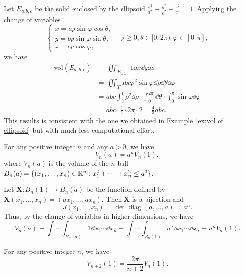 \begin{exampleenv}
    Let $E_{a,b,c}$ be the solid enclosed by the ellipsoid $\displaystyle \frac{x^2}{a^2} + \frac{y^2}{b^2} + \frac{z^2}{c^2} = 1$. Applying the change of variables
    \[
    \begin{cases}
    x = a \rho \sin \varphi \cos \theta,\\
    y = b \rho \sin \varphi \sin \theta,\\
    z = c \rho \cos \varphi,
    \end{cases}
    \quad \rho \geq 0, \theta \in [0, 2\pi), \varphi \in [0,\pi],
    \]
    we have
    \[
    \begin{aligned}
        \text{vol}(E_{a,b,c}) &= \iiint_{E_{a,b,c}} 1 \dd x \dd y \dd z\\
        &= \iiint_T a b c \rho^2 \sin\varphi \dd \rho \dd \theta \dd \varphi\\
        &= abc \int_0^1 \rho^2 \dd \rho \cdot \int_0^{2\pi} \dd \theta \cdot \int_0^\pi \sin\varphi \dd \varphi\\
        &= abc\cdot\frac{1}{3} \cdot 2\pi \cdot 2 = \frac{4}{3} abc.
    \end{aligned}
    \]
    This results is consistent with the one we obtained in Example~\ref{ex:vol of ellipsoid} but with much less computational effort.
\end{exampleenv}
\begin{lemmaenv}\label{lem:scaling for vol of n-ball}
    For any positive integer $n$ and any $a > 0$, we have
    $$
    V_n(a) = a^n V_n(1),
    $$
    where $V_n(a)$ is the volume of the $n$-ball $B_n(a) = \{(x_1, \ldots, x_n) \in \mathbb{R}^n : x_1^2 + \cdots + x_n^2 \leq a^2\}$.
\end{lemmaenv}
\begin{proofenv}
    Let $\bm X: B_n(1) \to B_n(a)$ be the function defined by $\bm X(x_1, \ldots, x_n) = (a x_1, \ldots, a x_n)$. Then $\bm X$ is a bijection and
    \[
    J(x_1, \ldots, x_n) = \det \operatorname{diag}(a, \ldots, a) = a^n.
    \]
    Thus, by the change of variables in higher dimensions, we have
    \[
    V_n(a) = \int \cdots \int_{B_n(a)} 1 \dd x_1 \cdots \dd x_n = \int \cdots \int_{B_n(1)} a^n \dd x_1 \cdots \dd x_n = a^n V_n(1).
    \]
\end{proofenv}
\begin{lemmaenv}\label{lem:recursion for vol of n-ball}
    For any positive integer $n$, we have
    $$
    V_{n+2}(1) = \frac{2\pi}{n+2} V_n(1).
    $$
\end{lemmaenv}
